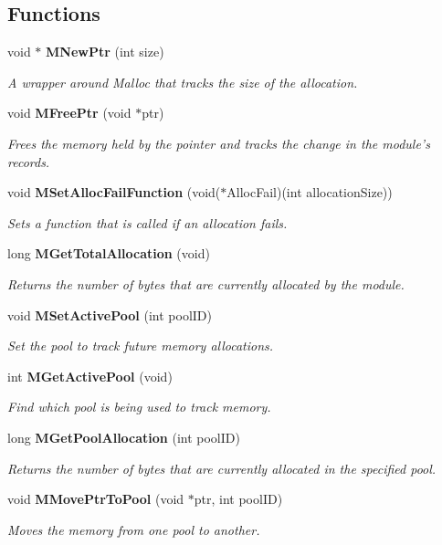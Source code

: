 \subsection*{Functions}
\begin{CompactItemize}
\item 
void $\ast$ {\bf MNew\-Ptr} (int size)
\begin{CompactList}\small\item\em A wrapper around Malloc that tracks the size of the allocation. \item\end{CompactList}\item 
void {\bf MFree\-Ptr} (void $\ast$ptr)
\begin{CompactList}\small\item\em Frees the memory held by the pointer and tracks the change in the module's records. \item\end{CompactList}\item 
void {\bf MSet\-Alloc\-Fail\-Function} (void($\ast$Alloc\-Fail)(int allocation\-Size))
\begin{CompactList}\small\item\em Sets a function that is called if an allocation fails. \item\end{CompactList}\item 
long {\bf MGet\-Total\-Allocation} (void)
\begin{CompactList}\small\item\em Returns the number of bytes that are currently allocated by the module. \item\end{CompactList}\item 
void {\bf MSet\-Active\-Pool} (int pool\-ID)
\begin{CompactList}\small\item\em Set the pool to track future memory allocations. \item\end{CompactList}\item 
int {\bf MGet\-Active\-Pool} (void)
\begin{CompactList}\small\item\em Find which pool is being used to track memory. \item\end{CompactList}\item 
long {\bf MGet\-Pool\-Allocation} (int pool\-ID)
\begin{CompactList}\small\item\em Returns the number of bytes that are currently allocated in the specified pool. \item\end{CompactList}\item 
void {\bf MMove\-Ptr\-To\-Pool} (void $\ast$ptr, int pool\-ID)
\begin{CompactList}\small\item\em Moves the memory from one pool to another. \item\end{CompactList}\end{CompactItemize}


